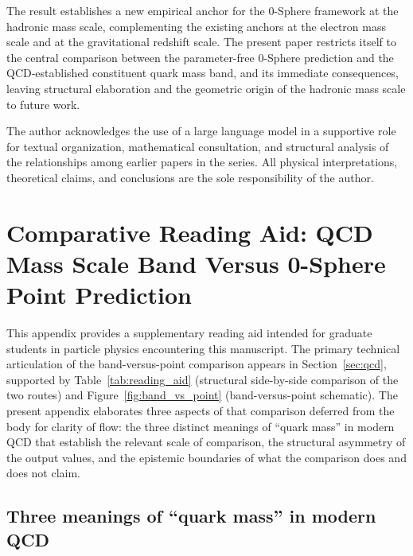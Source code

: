 \documentclass[%
 reprint, amsmath,amssymb, aps, prc, ]{revtex4-2}
\numberwithin{equation}{section}
\begin{document}
The result establishes a new empirical anchor for the 0-Sphere framework at the hadronic mass scale, complementing the existing anchors at the electron mass scale and at the gravitational redshift scale.
The present paper restricts itself to the central comparison between the parameter-free 0-Sphere prediction and the QCD-established constituent quark mass band, and its immediate consequences, leaving structural elaboration and the geometric origin of the hadronic mass scale to future work.

\begin{acknowledgments}
The author acknowledges the use of a large language model in a supportive role for textual organization, mathematical consultation, and structural analysis of the relationships among earlier papers in the series. All physical interpretations, theoretical claims, and conclusions are the sole responsibility of the author.
\end{acknowledgments}
\appendix

\section{Comparative Reading Aid: QCD Mass Scale Band Versus 0-Sphere Point Prediction}
\label{app:reading_aid}

This appendix provides a supplementary reading aid intended for graduate students in particle physics encountering this manuscript. The primary technical articulation of the band-versus-point comparison appears in Section~\ref{sec:qcd}, supported by Table~\ref{tab:reading_aid} (structural side-by-side comparison of the two routes) and Figure~\ref{fig:band_vs_point} (band-versus-point schematic). The present appendix elaborates three aspects of that comparison deferred from the body for clarity of flow: the three distinct meanings of ``quark mass'' in modern QCD that establish the relevant scale of comparison, the structural asymmetry of the output values, and the epistemic boundaries of what the comparison does and does not claim.

\subsection{Three meanings of ``quark mass'' in modern QCD}
\label{app:three_quark_masses}
\end{document}
